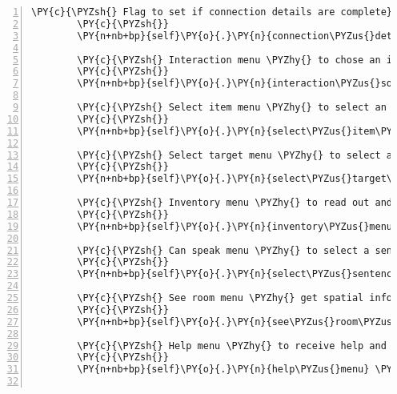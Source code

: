 \begin{Verbatim}[commandchars=\\\{\},numbers=left,firstnumber=1,stepnumber=1]
        \PY{c}{\PYZsh{} Flag to set if connection details are complete}
        \PY{c}{\PYZsh{}}
        \PY{n+nb+bp}{self}\PY{o}{.}\PY{n}{connection\PYZus{}details\PYZus{}complete} \PY{o}{=} \PY{n+nb+bp}{False}

        \PY{c}{\PYZsh{} Interaction menu \PYZhy{} to chose an interaction type}
        \PY{c}{\PYZsh{}}
        \PY{n+nb+bp}{self}\PY{o}{.}\PY{n}{interaction\PYZus{}sound\PYZus{}menu} \PY{o}{=} \PY{n+nb+bp}{self}\PY{o}{.}\PY{n}{\PYZus{}set\PYZus{}up\PYZus{}interaction\PYZus{}menu}\PY{p}{(}\PY{p}{)}

        \PY{c}{\PYZsh{} Select item menu \PYZhy{} to select an item for interaction use}
        \PY{c}{\PYZsh{}}
        \PY{n+nb+bp}{self}\PY{o}{.}\PY{n}{select\PYZus{}item\PYZus{}menu} \PY{o}{=} \PY{n+nb+bp}{self}\PY{o}{.}\PY{n}{\PYZus{}set\PYZus{}up\PYZus{}select\PYZus{}item\PYZus{}menu}\PY{p}{(}\PY{p}{)}

        \PY{c}{\PYZsh{} Select target menu \PYZhy{} to select a target for an interaction}
        \PY{c}{\PYZsh{}}
        \PY{n+nb+bp}{self}\PY{o}{.}\PY{n}{select\PYZus{}target\PYZus{}menu} \PY{o}{=} \PY{n+nb+bp}{self}\PY{o}{.}\PY{n}{\PYZus{}set\PYZus{}up\PYZus{}select\PYZus{}target\PYZus{}menu}\PY{p}{(}\PY{p}{)}

        \PY{c}{\PYZsh{} Inventory menu \PYZhy{} to read out and look at all inventory (rack) items}
        \PY{c}{\PYZsh{}}
        \PY{n+nb+bp}{self}\PY{o}{.}\PY{n}{inventory\PYZus{}menu} \PY{o}{=} \PY{n+nb+bp}{self}\PY{o}{.}\PY{n}{\PYZus{}set\PYZus{}up\PYZus{}inventory\PYZus{}menu}\PY{p}{(}\PY{p}{)}

        \PY{c}{\PYZsh{} Can speak menu \PYZhy{} to select a sentence to speak}
        \PY{c}{\PYZsh{}}
        \PY{n+nb+bp}{self}\PY{o}{.}\PY{n}{select\PYZus{}sentence\PYZus{}menu} \PY{o}{=} \PY{n+nb+bp}{self}\PY{o}{.}\PY{n}{\PYZus{}set\PYZus{}up\PYZus{}can\PYZus{}speak\PYZus{}menu}\PY{p}{(}\PY{p}{)}

        \PY{c}{\PYZsh{} See room menu \PYZhy{} get spatial information about all entities in the room}
        \PY{c}{\PYZsh{}}
        \PY{n+nb+bp}{self}\PY{o}{.}\PY{n}{see\PYZus{}room\PYZus{}menu} \PY{o}{=} \PY{n+nb+bp}{self}\PY{o}{.}\PY{n}{\PYZus{}set\PYZus{}up\PYZus{}see\PYZus{}room\PYZus{}menu}\PY{p}{(}\PY{p}{)}

        \PY{c}{\PYZsh{} Help menu \PYZhy{} to receive help and select help options}
        \PY{c}{\PYZsh{}}
        \PY{n+nb+bp}{self}\PY{o}{.}\PY{n}{help\PYZus{}menu} \PY{o}{=} \PY{n+nb+bp}{self}\PY{o}{.}\PY{n}{\PYZus{}set\PYZus{}up\PYZus{}help\PYZus{}menu}\PY{p}{(}\PY{p}{)}


\end{Verbatim}
